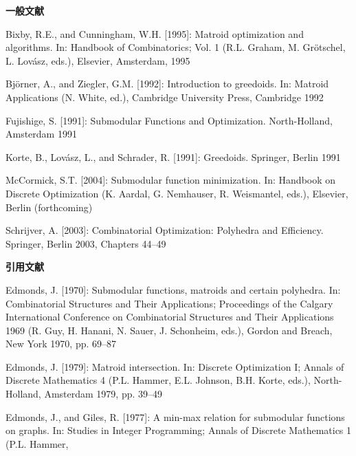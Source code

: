 {\small\setlength{\parindent}{0pt}\setlength{\parskip}{5pt}\sloppy
\textbf{一般文献}\par
Bixby, R.E., and Cunningham, W.H. [1995]: Matroid optimization and algorithms. In: Handbook of Combinatorics; Vol. 1 (R.L. Graham, M. Grötschel, L. Lovász, eds.), Elsevier, Amsterdam, 1995\par
Björner, A., and Ziegler, G.M. [1992]: Introduction to greedoids. In: Matroid Applications (N. White, ed.), Cambridge University Press, Cambridge 1992\par
Fujishige, S. [1991]: Submodular Functions and Optimization. North-Holland, Amsterdam 1991\par
Korte, B., Lovász, L., and Schrader, R. [1991]: Greedoids. Springer, Berlin 1991\par
McCormick, S.T. [2004]: Submodular function minimization. In: Handbook on Discrete Optimization (K. Aardal, G. Nemhauser, R. Weismantel, eds.), Elsevier, Berlin (forthcoming)\par
Schrijver, A. [2003]: Combinatorial Optimization: Polyhedra and Efficiency. Springer, Berlin 2003, Chapters 44–49\par
\textbf{引用文献}\par
Edmonds, J. [1970]: Submodular functions, matroids and certain polyhedra. In: Combinatorial Structures and Their Applications; Proceedings of the Calgary International Conference on Combinatorial Structures and Their Applications 1969 (R. Guy, H. Hanani, N. Sauer, J. Schonheim, eds.), Gordon and Breach, New York 1970, pp. 69–87\par
Edmonds, J. [1979]: Matroid intersection. In: Discrete Optimization I; Annals of Discrete Mathematics 4 (P.L. Hammer, E.L. Johnson, B.H. Korte, eds.), North-Holland, Amsterdam 1979, pp. 39–49\par
Edmonds, J., and Giles, R. [1977]: A min-max relation for submodular functions on graphs. In: Studies in Integer Programming; Annals of Discrete Mathematics 1 (P.L. Hammer,\par
}
